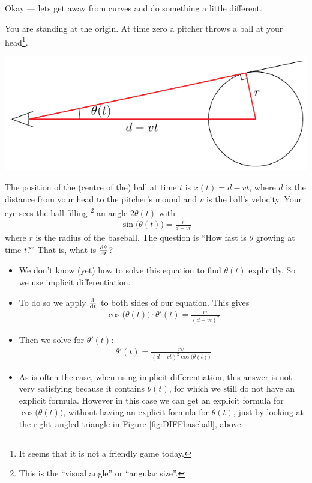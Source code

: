 Okay --- lets get away from curves and do something a little different.

\begin{eg}\label{eg:DIFFimpldiffC}
You are standing at the origin. At time zero a pitcher throws a ball at
your head\footnote{It seems that it is not a friendly game today.}.
\begin{sfig}\label{fig:DIFFbaseball}
\begin{center}
  \includegraphics{baseball}
\end{center}
\end{sfig}
The position of the (centre of the) ball at time $t$ is $x(t)=d-vt$, where $d$ is
the distance from your head to the  pitcher's mound and $v$ is the ball's
velocity. Your eye sees the ball filling \footnote{This is the ``visual angle''
or ``angular size''.} an angle $2\theta(t)$ with
\begin{align*}\label{eq:DIFFbaseball}
\sin\big(\theta(t)\big)=\frac{r}{d-vt}
\end{align*}
where $r$ is the radius of the baseball. The question is ``How fast is
$\theta$ growing at time $t$?'' That is, what is $\diff{\theta}{t}$?

\begin{itemize}
 \item We don't know (yet) how to solve this equation to find
$\theta(t)$ explicitly. So we use implicit differentiation.

\item To do so we apply $\diff{}{t}$ to both sides of
our equation. This gives
\begin{align*}
\cos\big(\theta(t)\big)\cdot\theta'(t)=\frac{rv}{(d-vt)^2}
\end{align*}
\item Then we solve for $\theta'(t)$:
\begin{align*}
\theta'(t)=\frac{rv}{(d-vt)^2\cos\big(\theta(t)\big)}
\end{align*}
\item As is often the case, when using implicit differentiation, this answer
is not very satisfying because it contains $\theta(t)$, for which we still
do not have an explicit formula. However in this case we can get an
explicit formula for $\cos\big(\theta(t)\big)$, without having an explicit
formula for $\theta(t)$, just by looking at the right--angled triangle
in Figure \ref{fig:DIFFbaseball}, above.


\end{itemize}
\end{eg}
